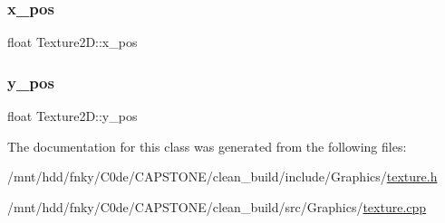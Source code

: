 \mbox{\label{classTexture2D_a5d7a290a99c99a921e0bbed6e8b529f8}} 
\subsubsection{\texorpdfstring{x\+\_\+pos}{x\_pos}}
{\footnotesize\ttfamily float Texture2\+D\+::x\+\_\+pos}

\mbox{\label{classTexture2D_aeb7e15444821c2bb23d5026ca4430e58}} 
\subsubsection{\texorpdfstring{y\+\_\+pos}{y\_pos}}
{\footnotesize\ttfamily float Texture2\+D\+::y\+\_\+pos}



The documentation for this class was generated from the following files\+:\begin{DoxyCompactItemize}
\item 
/mnt/hdd/fnky/\+C0de/\+C\+A\+P\+S\+T\+O\+N\+E/clean\+\_\+build/include/\+Graphics/\hyperlink{texture_8h}{texture.\+h}\item 
/mnt/hdd/fnky/\+C0de/\+C\+A\+P\+S\+T\+O\+N\+E/clean\+\_\+build/src/\+Graphics/\hyperlink{texture_8cpp}{texture.\+cpp}\end{DoxyCompactItemize}
